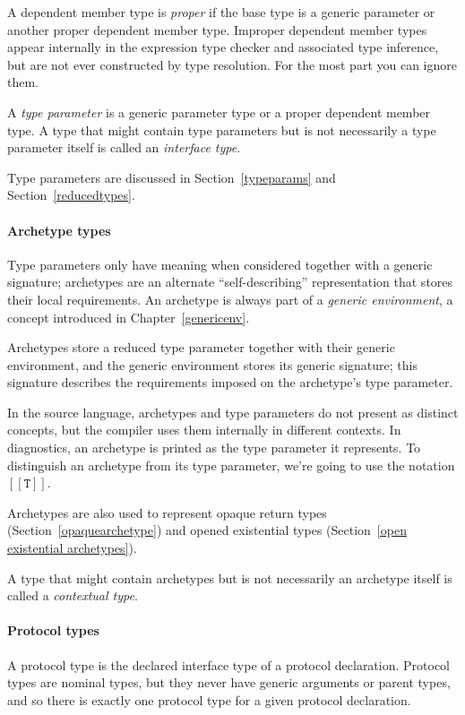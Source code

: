 \documentclass[a4paper,headsepline,bibliography=totoc,toc=flat,fleqn,twoside=semi]{scrbook}
\theoremstyle{definition}
\theoremstyle{definition}
\theoremstyle{definition}
\newcommand{\archetype}[1]{$[\![\texttt{#1}]\!]$}
\begin{document}
A dependent member type is \emph{proper} if the base type is a generic parameter or another proper dependent member type. Improper dependent member types appear internally in the expression type checker and associated type inference, but are not ever constructed by type resolution. For the most part you can ignore them.

A \emph{type parameter} is a generic parameter type or a proper dependent member type. A type that might contain type parameters but is not necessarily a type parameter itself is called an \emph{interface type}.

Type parameters are discussed in Section~\ref{typeparams} and Section~\ref{reducedtypes}.

\paragraph{Archetype types}
Type parameters only have meaning when considered together with a generic signature; archetypes are an alternate ``self-describing'' representation that stores their local requirements. An archetype is always part of a \emph{generic environment}, a concept introduced in Chapter~\ref{genericenv}.

Archetypes store a reduced type parameter together with their generic environment, and the generic environment stores its generic signature; this signature describes the requirements imposed on the archetype's type parameter.

In the source language, archetypes and type parameters do not present as distinct concepts, but the compiler uses them internally in different contexts. In diagnostics, an archetype is printed as the type parameter it represents. To distinguish an archetype from its type parameter, we're going to use the notation \archetype{T}.

Archetypes are also used to represent opaque return types (Section~\ref{opaquearchetype}) and opened existential types (Section~\ref{open existential archetypes}).

A type that might contain archetypes but is not necessarily an archetype itself is called a \emph{contextual type}.

\paragraph{Protocol types}
A protocol type is the declared interface type of a protocol declaration. Protocol types are nominal types, but they never have generic arguments or parent types, and so there is exactly one protocol type for a given protocol declaration.
\end{document}
